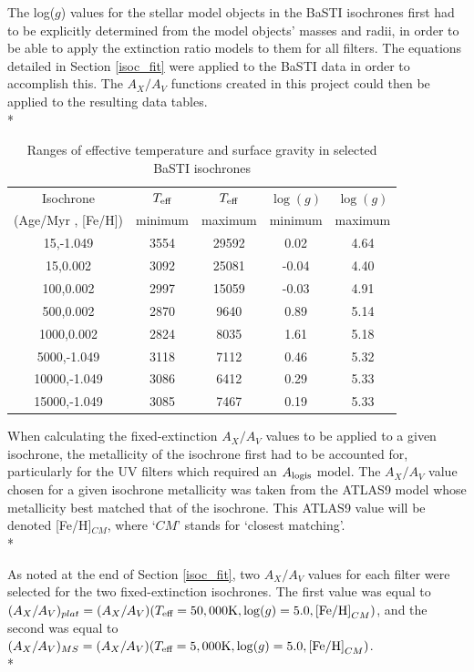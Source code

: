 \documentclass[12pt, a4paper]{report}
\begin{document}
The log($g$) values for the stellar model objects in the BaSTI isochrones first had to be explicitly determined from the model objects' masses and radii, in order to be able to apply the extinction ratio models to them for all filters. The equations detailed in Section \ref{isoc_fit} were applied to the BaSTI data in order to accomplish this. The $A_{X}/A_{V}$ functions created in this project could then be applied to the resulting data tables. \\*


\begin{table}
\begin{center}
\begin{tabular}{ccccc}
\hline
Isochrone & $T_{\textnormal{eff}}$ & $T_{\textnormal{eff}}$ & $\log(g)$ & $\log(g)$ \\
(Age/Myr , [Fe/H]) & minimum & maximum & minimum & maximum \\
\hline
15,-1.049 & 3554 & 29592 & 0.02 & 4.64 \\
15,0.002 & 3092 & 25081 & -0.04 & 4.40 \\
100,0.002 & 2997 & 15059 & -0.03 & 4.91 \\
500,0.002 & 2870 & 9640 & 0.89 & 5.14 \\
1000,0.002 & 2824 & 8035 & 1.61 & 5.18 \\
5000,-1.049 & 3118 & 7112 & 0.46 & 5.32 \\
10000,-1.049 & 3086 & 6412 & 0.29 & 5.33 \\
15000,-1.049 & 3085 & 7467 & 0.19 & 5.33 \\
\hline
\end{tabular}
\caption{Ranges of effective temperature and surface gravity in selected BaSTI isochrones}
\label{isoc_variable_ranges}
\end{center}
\end{table}

When calculating the fixed-extinction $A_{X}/A_{V}$ values to be applied to a given isochrone, the metallicity of the isochrone first had to be accounted for, particularly for the UV filters which required an $A_{\textnormal{logis}}$ model. The $A_{X}/A_{V}$ value chosen for a given isochrone metallicity was taken from the ATLAS9 model whose metallicity best matched that of the isochrone. This ATLAS9 value will be denoted [Fe/H]$_{CM}$, where `$CM$' stands for `closest matching'.\\*

As noted at the end of Section \ref{isoc_fit}, two $A_{X}/A_{V}$ values for each filter were selected for the two fixed-extinction isochrones. The first value was equal to $(A_{X}/A_{V})_{plat} = (A_{X}/A_{V})(T_{\textnormal{eff}} = 50,000\textnormal{K},\log(g) = 5.0,\textnormal{[Fe/H]}_{CM})$, and the second was equal to $(A_{X}/A_{V})_{MS} = (A_{X}/A_{V})(T_{\textnormal{eff}} = 5,000\textnormal{K},\log(g) = 5.0,\textnormal{[Fe/H]}_{CM})$.\\*
\end{document}

